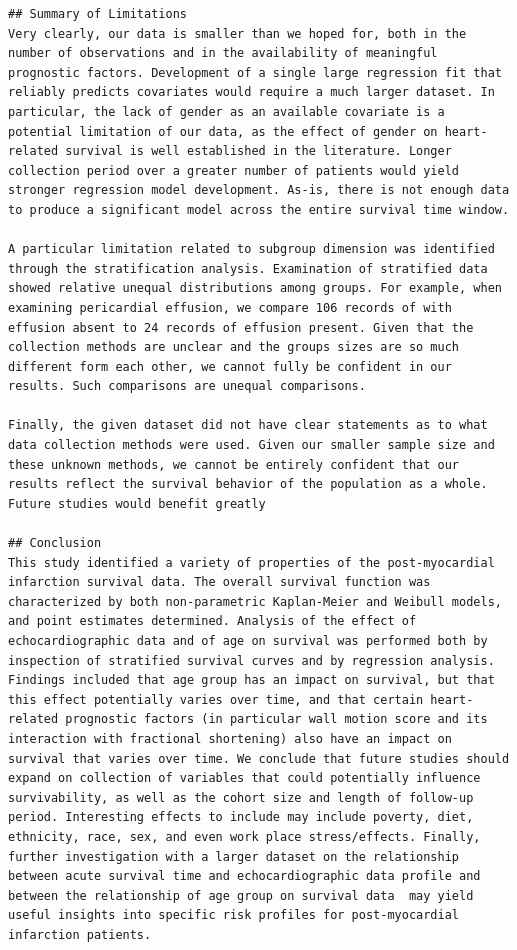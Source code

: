 \documentclass[
]{article}
\begin{document}
\begin{verbatim}
## Summary of Limitations
Very clearly, our data is smaller than we hoped for, both in the number of observations and in the availability of meaningful prognostic factors. Development of a single large regression fit that reliably predicts covariates would require a much larger dataset. In particular, the lack of gender as an available covariate is a potential limitation of our data, as the effect of gender on heart-related survival is well established in the literature. Longer collection period over a greater number of patients would yield stronger regression model development. As-is, there is not enough data to produce a significant model across the entire survival time window. 

A particular limitation related to subgroup dimension was identified through the stratification analysis. Examination of stratified data showed relative unequal distributions among groups. For example, when examining pericardial effusion, we compare 106 records of with effusion absent to 24 records of effusion present. Given that the collection methods are unclear and the groups sizes are so much different form each other, we cannot fully be confident in our results. Such comparisons are unequal comparisons. 

Finally, the given dataset did not have clear statements as to what data collection methods were used. Given our smaller sample size and these unknown methods, we cannot be entirely confident that our results reflect the survival behavior of the population as a whole. Future studies would benefit greatly 

## Conclusion
This study identified a variety of properties of the post-myocardial infarction survival data. The overall survival function was characterized by both non-parametric Kaplan-Meier and Weibull models, and point estimates determined. Analysis of the effect of echocardiographic data and of age on survival was performed both by inspection of stratified survival curves and by regression analysis. Findings included that age group has an impact on survival, but that this effect potentially varies over time, and that certain heart-related prognostic factors (in particular wall motion score and its interaction with fractional shortening) also have an impact on survival that varies over time. We conclude that future studies should expand on collection of variables that could potentially influence survivability, as well as the cohort size and length of follow-up period. Interesting effects to include may include poverty, diet, ethnicity, race, sex, and even work place stress/effects. Finally, further investigation with a larger dataset on the relationship between acute survival time and echocardiographic data profile and between the relationship of age group on survival data  may yield useful insights into specific risk profiles for post-myocardial infarction patients. 


\end{verbatim}
\end{document}
